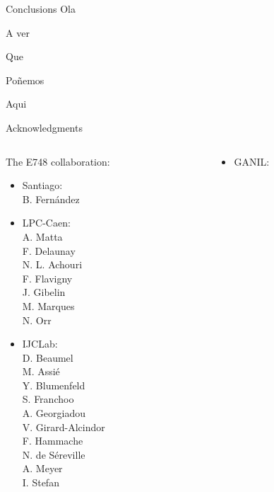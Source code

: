 \documentclass[aspectratio=43, dvipsnames]{beamer}
\begin{document}
\begin{frame}[c]{Conclusions}
    Ola

    A ver

    Que

    Poñemos

    Aqui
\end{frame}

\begin{frame}[plain]{Acknowledgments}
    \begin{columns}[T]
        \begin{column}{0.33\linewidth}
            The E748 collaboration:
            \begin{itemize}\scriptsize
                \item Santiago:\\
                      B. Fernández
                \item LPC-Caen:\\
                      A. Matta\\
                      F. Delaunay\\
                      N. L. Achouri\\
                      F. Flavigny\\
                      J. Gibelin\\
                      M. Marques\\
                      N. Orr
                \item IJCLab:\\
                      D. Beaumel\\
                      M. Assié\\
                      Y. Blumenfeld\\
                      S. Franchoo\\
                      A. Georgiadou\\
                      V. Girard-Alcindor\\
                      F. Hammache\\
                      N. de Séreville\\
                      A. Meyer\\
                      I. Stefan
            \end{itemize}
        \end{column}
        \begin{column}{0.33\linewidth}
            \begin{itemize}\scriptsize
                \item GANIL:\\

\end{itemize}
\end{column}
\end{columns}
\end{frame}
\end{document}

